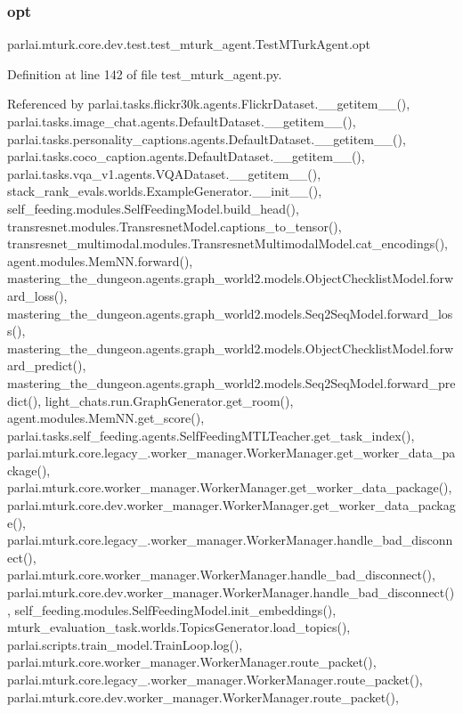 \subsubsection{\texorpdfstring{opt}{opt}}
{\footnotesize\ttfamily parlai.\+mturk.\+core.\+dev.\+test.\+test\+\_\+mturk\+\_\+agent.\+Test\+M\+Turk\+Agent.\+opt}



Definition at line 142 of file test\+\_\+mturk\+\_\+agent.\+py.



Referenced by parlai.\+tasks.\+flickr30k.\+agents.\+Flickr\+Dataset.\+\_\+\+\_\+getitem\+\_\+\+\_\+(), parlai.\+tasks.\+image\+\_\+chat.\+agents.\+Default\+Dataset.\+\_\+\+\_\+getitem\+\_\+\+\_\+(), parlai.\+tasks.\+personality\+\_\+captions.\+agents.\+Default\+Dataset.\+\_\+\+\_\+getitem\+\_\+\+\_\+(), parlai.\+tasks.\+coco\+\_\+caption.\+agents.\+Default\+Dataset.\+\_\+\+\_\+getitem\+\_\+\+\_\+(), parlai.\+tasks.\+vqa\+\_\+v1.\+agents.\+V\+Q\+A\+Dataset.\+\_\+\+\_\+getitem\+\_\+\+\_\+(), stack\+\_\+rank\+\_\+evals.\+worlds.\+Example\+Generator.\+\_\+\+\_\+init\+\_\+\+\_\+(), self\+\_\+feeding.\+modules.\+Self\+Feeding\+Model.\+build\+\_\+head(), transresnet.\+modules.\+Transresnet\+Model.\+captions\+\_\+to\+\_\+tensor(), transresnet\+\_\+multimodal.\+modules.\+Transresnet\+Multimodal\+Model.\+cat\+\_\+encodings(), agent.\+modules.\+Mem\+N\+N.\+forward(), mastering\+\_\+the\+\_\+dungeon.\+agents.\+graph\+\_\+world2.\+models.\+Object\+Checklist\+Model.\+forward\+\_\+loss(), mastering\+\_\+the\+\_\+dungeon.\+agents.\+graph\+\_\+world2.\+models.\+Seq2\+Seq\+Model.\+forward\+\_\+loss(), mastering\+\_\+the\+\_\+dungeon.\+agents.\+graph\+\_\+world2.\+models.\+Object\+Checklist\+Model.\+forward\+\_\+predict(), mastering\+\_\+the\+\_\+dungeon.\+agents.\+graph\+\_\+world2.\+models.\+Seq2\+Seq\+Model.\+forward\+\_\+predict(), light\+\_\+chats.\+run.\+Graph\+Generator.\+get\+\_\+room(), agent.\+modules.\+Mem\+N\+N.\+get\+\_\+score(), parlai.\+tasks.\+self\+\_\+feeding.\+agents.\+Self\+Feeding\+M\+T\+L\+Teacher.\+get\+\_\+task\+\_\+index(), parlai.\+mturk.\+core.\+legacy\+\_.\+worker\+\_\+manager.\+Worker\+Manager.\+get\+\_\+worker\+\_\+data\+\_\+package(), parlai.\+mturk.\+core.\+worker\+\_\+manager.\+Worker\+Manager.\+get\+\_\+worker\+\_\+data\+\_\+package(), parlai.\+mturk.\+core.\+dev.\+worker\+\_\+manager.\+Worker\+Manager.\+get\+\_\+worker\+\_\+data\+\_\+package(), parlai.\+mturk.\+core.\+legacy\+\_.\+worker\+\_\+manager.\+Worker\+Manager.\+handle\+\_\+bad\+\_\+disconnect(), parlai.\+mturk.\+core.\+worker\+\_\+manager.\+Worker\+Manager.\+handle\+\_\+bad\+\_\+disconnect(), parlai.\+mturk.\+core.\+dev.\+worker\+\_\+manager.\+Worker\+Manager.\+handle\+\_\+bad\+\_\+disconnect(), self\+\_\+feeding.\+modules.\+Self\+Feeding\+Model.\+init\+\_\+embeddings(), mturk\+\_\+evaluation\+\_\+task.\+worlds.\+Topics\+Generator.\+load\+\_\+topics(), parlai.\+scripts.\+train\+\_\+model.\+Train\+Loop.\+log(), parlai.\+mturk.\+core.\+worker\+\_\+manager.\+Worker\+Manager.\+route\+\_\+packet(), parlai.\+mturk.\+core.\+legacy\+\_.\+worker\+\_\+manager.\+Worker\+Manager.\+route\+\_\+packet(), parlai.\+mturk.\+core.\+dev.\+worker\+\_\+manager.\+Worker\+Manager.\+route\+\_\+packet(), 